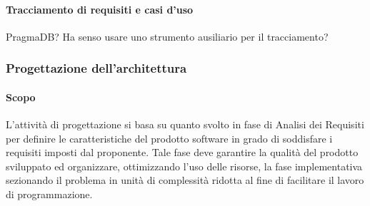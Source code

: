 \paragraph{Tracciamento di requisiti e casi d'uso}
PragmaDB? Ha senso usare uno strumento ausiliario per il tracciamento? 

\subsubsection{Progettazione dell'architettura}
\paragraph{Scopo}
L'attività di progettazione si basa su quanto svolto in fase di Analisi dei Requisiti per definire le caratteristiche del prodotto software in grado di soddisfare i requisiti imposti dal proponente.  Tale fase deve garantire la qualità del prodotto sviluppato ed organizzare, ottimizzando l'uso delle risorse, la fase implementativa sezionando il problema in unità di complessità ridotta al fine di facilitare il lavoro di programmazione.

